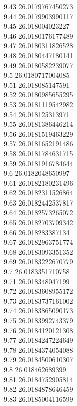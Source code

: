 {9.43	26.0179767450273\\
9.44	26.0179903990117\\
9.45	26.018004023227\\
9.46	26.0180176177489\\
9.47	26.0180311826528\\
9.48	26.0180447180141\\
9.49	26.0180582239077\\
9.5	26.0180717004085\\
9.51	26.018085147591\\
9.52	26.0180985655295\\
9.53	26.0181119542982\\
9.54	26.018125313971\\
9.55	26.0181386446214\\
9.56	26.0181519463229\\
9.57	26.0181652191486\\
9.58	26.0181784631715\\
9.59	26.0181916784644\\
9.6	26.0182048650997\\
9.61	26.0182180231496\\
9.62	26.0182311526864\\
9.63	26.0182442537817\\
9.64	26.0182573265072\\
9.65	26.0182703709342\\
9.66	26.018283387134\\
9.67	26.0182963751774\\
9.68	26.0183093351352\\
9.69	26.0183222670779\\
9.7	26.0183351710758\\
9.71	26.018348047199\\
9.72	26.0183608955172\\
9.73	26.0183737161002\\
9.74	26.0183865090173\\
9.75	26.0183992743379\\
9.76	26.0184120121308\\
9.77	26.0184247224649\\
9.78	26.0184374054088\\
9.79	26.0184500610307\\
9.8	26.018462689399\\
9.81	26.0184752905814\\
9.82	26.0184878646459\\
9.83	26.0185004116599\\
}
